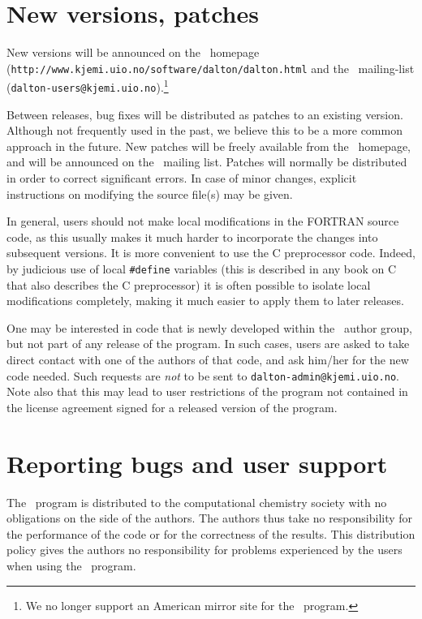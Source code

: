\section{New versions, patches}

New versions will be announced on the \dalton\
homepage\\
(\verb|http://www.kjemi.uio.no/software/dalton/dalton.html| 
and the \dalton\ mailing-list
(\verb|dalton-users@kjemi.uio.no|).\footnote{We no
  longer support an American mirror site for the \dalton\ program.}

Between releases, bug fixes will be distributed as
patches to an
existing version. Although not frequently used in the past, we believe
this to be a more common approach in the future. New patches will be
freely available from the 
\dalton\ homepage, and will be announced on the \dalton\ mailing
list. Patches will normally be distributed in order to correct
significant errors. In case of minor changes, explicit
instructions on modifying the source file(s) may be given.

In general, users should not make local
modifications in the FORTRAN source code, as this usually makes it
much harder to incorporate the changes into subsequent versions.
It is more convenient to use the C preprocessor code.  Indeed, by
judicious use of local \verb|#define|\index{define} variables (this
is described in any book on C that also describes the C
preprocessor) it is often possible to isolate local
modifications completely, making it much easier
to apply them to later
releases.

One may be interested in code that is newly developed within the
\dalton\ author group, but not part of any release of the program. In
such cases, users are asked to take direct contact with one of the
authors of that code, and ask him/her for the new code
needed. Such requests are {\em not} to be sent to
\verb|dalton-admin@kjemi.uio.no|. Note also that this may lead to user
restrictions of the program not contained in the license agreement
signed for a released version of the program.

\section{Reporting bugs and user support}

The \dalton\ program is distributed to the computational chemistry
society with no obligations on the side of the
authors. The authors thus take no responsibility
for the performance
of the code or for the correctness of the
results. This distribution
policy gives the authors no responsibility for problems experienced by
the users when using the \dalton\ program.

